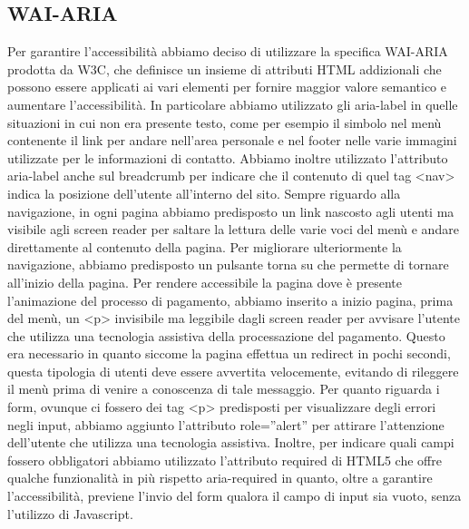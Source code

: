 \documentclass[a4paper]{article}
\begin{document}
	\subsection{WAI-ARIA}
	Per garantire l'accessibilità abbiamo deciso di utilizzare la specifica WAI-ARIA prodotta da W3C, che definisce un insieme di attributi HTML addizionali che possono essere applicati ai vari elementi per fornire maggior valore semantico e aumentare l'accessibilità. In particolare abbiamo utilizzato gli aria-label in quelle situazioni in cui non era presente testo, come per esempio il simbolo nel menù contenente il link per andare nell'area personale e nel footer nelle varie immagini utilizzate per le informazioni di contatto. Abbiamo inoltre utilizzato l'attributo aria-label anche sul breadcrumb per indicare che il contenuto di quel tag <nav> indica la posizione dell'utente all'interno del sito. Sempre riguardo alla navigazione, in ogni pagina abbiamo predisposto un link nascosto agli utenti ma visibile agli screen reader per saltare la lettura delle varie voci del menù e andare direttamente al contenuto della pagina. Per migliorare ulteriormente la navigazione, abbiamo predisposto un pulsante torna su che permette di tornare all'inizio della pagina. Per rendere accessibile la pagina dove è presente l'animazione del processo di pagamento, abbiamo inserito a inizio pagina, prima del menù, un <p> invisibile ma leggibile dagli screen reader per avvisare l'utente che utilizza una tecnologia assistiva della processazione del pagamento. Questo era necessario in quanto siccome la pagina effettua un redirect in pochi secondi, questa tipologia di utenti deve essere avvertita velocemente, evitando di rileggere il menù prima di venire a conoscenza di tale messaggio. Per quanto riguarda i form, ovunque ci fossero dei tag <p> predisposti per visualizzare degli errori negli input, abbiamo aggiunto l'attributo role=”alert” per attirare l'attenzione dell'utente che utilizza una tecnologia assistiva. Inoltre, per indicare quali campi fossero obbligatori abbiamo utilizzato l'attributo required di HTML5 che offre qualche funzionalità in più rispetto aria-required in quanto, oltre a garantire l'accessibilità, previene l'invio del form qualora il campo di input sia vuoto, senza l'utilizzo di Javascript.
\end{document}
